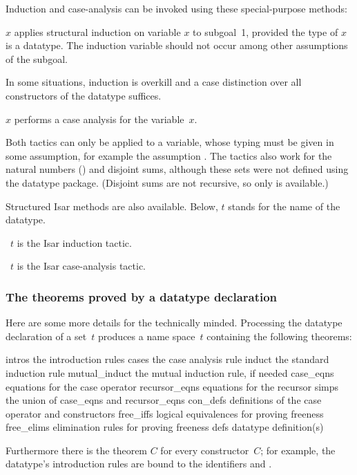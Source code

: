 Induction and case-analysis can be invoked using these special-purpose
methods:
\begin{ttdescription}
\item[\methdx{induct_tac} $x$] applies structural
  induction on variable $x$ to subgoal~1, provided the type of $x$ is a
  datatype.  The induction variable should not occur among other assumptions
  of the subgoal.
\end{ttdescription}
% 
In some situations, induction is overkill and a case distinction over all
constructors of the datatype suffices.
\begin{ttdescription}
\item[\methdx{case_tac} $x$]
 performs a case analysis for the variable~$x$.
\end{ttdescription}

Both tactics can only be applied to a variable, whose typing must be given in
some assumption, for example the assumption .  The tactics
also work for the natural numbers () and disjoint sums, although
these sets were not defined using the datatype package.  (Disjoint sums are
not recursive, so only  is available.)

Structured Isar methods are also available. Below, $t$ 
stands for the name of the datatype.
\begin{ttdescription}
\item[\methdx{induct} \isa{set:}\ $t$] is the Isar induction tactic.
\item[\methdx{cases} \isa{set:}\ $t$] is the Isar case-analysis tactic.
\end{ttdescription}


\subsubsection{The theorems proved by a datatype declaration}

Here are some more details for the technically minded.  Processing the
datatype declaration of a set~$t$ produces a name space~$t$ containing
the following theorems:
\begin{ttbox}\isastyleminor
intros          \textrm{the introduction rules}
cases           \textrm{the case analysis rule}
induct          \textrm{the standard induction rule}
mutual_induct   \textrm{the mutual induction rule, if needed}
case_eqns       \textrm{equations for the case operator}
recursor_eqns   \textrm{equations for the recursor}
simps           \textrm{the union of} case_eqns \textrm{and} recursor_eqns
con_defs        \textrm{definitions of the case operator and constructors}
free_iffs       \textrm{logical equivalences for proving freeness}
free_elims      \textrm{elimination rules for proving freeness}
defs            \textrm{datatype definition(s)}
\end{ttbox}
Furthermore there is the theorem $C$ for every constructor~$C$; for
example, the  datatype's introduction rules are bound to the
identifiers  and .

